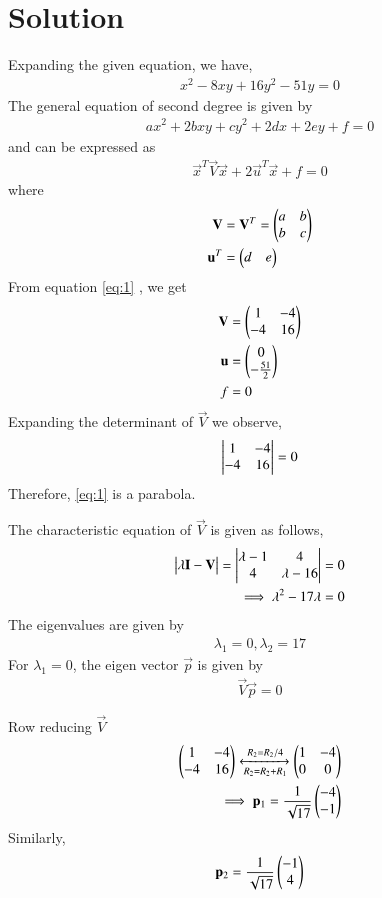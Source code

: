 \documentclass[journal,12pt,twocolumn]{IEEEtran}
\begin{document}
\section{Solution}
Expanding the given equation, we have,
\begin{align}
    x^2 -8xy +16y^2 -51y =0 \label{eq:1}
\end{align}
The general equation of second degree is given by
\begin{align}
	ax^2+2bxy+cy^2+2dx+2ey+f=0 \label{gen_eq}
\end{align}
and can be expressed as
\begin{align}
	\vec{x}^T\vec{V}\vec{x}+2\vec{u}^T\vec{x}+f=0 \label{conic_eq}
\end{align}
where
\begin{align}
	\mathbf{V} &= \mathbf{V}^T = \begin{pmatrix}a & b \\ b & c\end{pmatrix}
	\\
	\mathbf{u}^T &= \begin{pmatrix}d & e\end{pmatrix}
\end{align}
From equation \eqref{eq:1} , we get
\begin{align}
	\mathbf{V} &= \begin{pmatrix}1 & -4\\-4 & 16\end{pmatrix}\label{eq:2}\\
	\mathbf{u} &= \begin{pmatrix}0\\-\frac{51}{2}\end{pmatrix}\label{eq:3}\\ 
	f &= 0 \label{eq:4}
\end{align}
Expanding the determinant of $\vec{V}$ we observe, 
\begin{align}
	\begin{vmatrix}1 & -4\\-4 & 16\end{vmatrix} = 0 \label{eq:4}
\end{align}
Therefore, \eqref{eq:1} is a parabola.

The characteristic equation of $\vec{V}$ is given as follows,
\begin{align}
		\begin{vmatrix}\lambda\mathbf{I}-\mathbf{V}\end{vmatrix} = \begin{vmatrix}\lambda-1&4\\ 4&\lambda-16\end{vmatrix} &= 0\\
		\implies \lambda^2-17\lambda &= 0\label{eq:5}
\end{align}
The eigenvalues are given by
\begin{align}
		\lambda_1=0, \lambda_2=17\label{eq:6}    
\end{align}
For $\lambda_1 = 0$, the eigen vector $\vec{p}$ is given by 
\begin{align}
		\vec{V}\vec{p} = 0
\end{align}

Row reducing $\vec{V}$ 
\begin{align}
		\begin{pmatrix}1&-4\\-4&16\end{pmatrix}\xleftrightarrow[R_2=R_2+R_1]{R_2=R_2/4}\begin{pmatrix}1&-4\\0&0\end{pmatrix}\\
		\implies\mathbf{p}_1=\frac{1}{\sqrt{17}}\begin{pmatrix}-4\\-1\end{pmatrix} \label{eq:7}
\end{align}
Similarly, 
\begin{align}
		\mathbf{p}_2=\frac{1}{\sqrt{17}}\begin{pmatrix}-1\\4\end{pmatrix} \label{eq:8}
\end{align}
\end{document}
